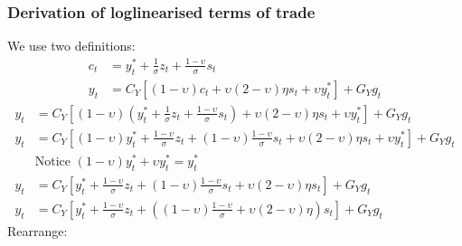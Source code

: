 \subsubsection*{Derivation of loglinearised terms of trade}
We use two definitions:
\begin{align} \label{eq:terms_of_trade_derivation_beginning}
    c_t & = y^*_t + \frac{1}{\sigma}z_t + \frac{1-\upsilon}{\sigma}s_t\\
    y_t &= C_Y\left[(1-\upsilon)c_t + \upsilon (2-\upsilon)\eta s_t + \upsilon y^*_t\right] + G_Y g_t
\end{align}
\begin{align} 
    y_t &= C_Y\left[(1-\upsilon)\left( y^*_t + \frac{1}{\sigma}z_t + \frac{1-\upsilon}{\sigma}s_t \right) + \upsilon (2-\upsilon)\eta s_t + \upsilon y^*_t\right] + G_Y g_t\\
    y_t &= C_Y\left[(1-\upsilon)y^*_t + \frac{1-\upsilon}{\sigma}z_t + (1-\upsilon)\frac{1-\upsilon}{\sigma}s_t + \upsilon (2-\upsilon)\eta s_t + \upsilon y^*_t\right] + G_Y g_t\\
    &\text{Notice $(1-\upsilon)y^*_t + \upsilon y^*_t = y^*_t$} \nonumber \\
    y_t &= C_Y\left[y^*_t + \frac{1-\upsilon}{\sigma}z_t + (1-\upsilon)\frac{1-\upsilon}{\sigma}s_t + \upsilon (2-\upsilon)\eta s_t\right] + G_Y g_t\\
    y_t &= C_Y\left[y^*_t + \frac{1-\upsilon}{\sigma}z_t + \left((1-\upsilon)\frac{1-\upsilon}{\sigma} + \upsilon (2-\upsilon)\eta \right) s_t\right] + G_Y g_t
\end{align} 
Rearrange:
